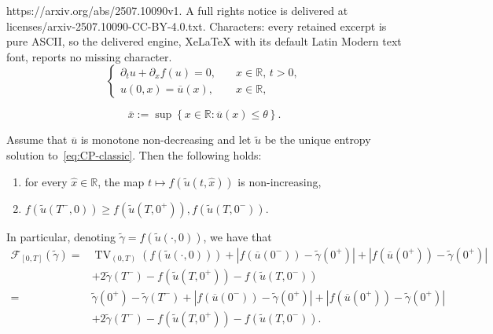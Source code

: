 \documentclass[10pt,a4paper]{amsart}
\newcommand{\R}{\mathbb{R}} \newcommand{\N}{\mathbb{N}}
\newcommand{\pt}{\partial_t}
\newcommand{\px}{\partial_x }
\DeclareMathOperator{\tv}{TV}
\begin{document}
https://arxiv.org/abs/2507.10090v1. A full rights notice is delivered at licenses/arxiv-2507.10090-CC-BY-4.0.txt. Characters: every retained excerpt is pure ASCII, so the delivered engine, XeLaTeX with its default Latin Modern text font, reports no missing character.
\begin{equation}
  \label{eq:CP-classic}
\begin{cases} \pt u + \px f(u) = 0, \quad & x \in \R, \, t > 0,\\ 
    u(0,x)= \overline u(x), & x \in \R,\end{cases}
\end{equation}

\begin{equation}\label{xbar} \bar x:= \sup\left\{x \in \R: \overline u(x) \le \theta\right\}.\end{equation}

\begin{lemma}\label{lemmafdecrescente}
  Assume that $\overline u $ is monotone non-decreasing and let  $\widetilde u$ be the unique entropy solution 
  to~\eqref{eq:CP-classic}.
  Then the following holds:
\begin{enumerate} \item for every $\hat x \in \R$, the map $t \mapsto f(\widetilde{u}(t, \hat{x}))$ is
  non-increasing,
  \item $f(\widetilde{u}(T^-, 0))\geq f(\widetilde{u}(T, 0^+)), f(\widetilde{u}(T, 0^-))$.\end{enumerate}

In particular, denoting $\widetilde \gamma=f(\widetilde u(\cdot,0))$, we have that 
\begin{align*} \mathcal F_{[0, T]}(\widetilde\gamma)
     = &
      \tv_{(0, T)}(f(\widetilde u(\cdot, 0)))
    +
    |f(\overline u(0^-))- \widetilde\gamma(0^+)| + 
    |f(\overline u(0^+))- \widetilde \gamma(0^+)| \\
    &+ 2\widetilde\gamma(T^-)-f(\widetilde{u}(T, 0^+))-f(\widetilde{u}(T, 0^-))
\\ = &  \widetilde \gamma(0^+)- \widetilde \gamma(T^-) +
    |f(\overline u(0^-))- \widetilde\gamma(0^+)| + 
    |f(\overline u(0^+))- \widetilde \gamma(0^+)| \\
    &+ 2\widetilde\gamma(T^-)-f(\widetilde{u}(T, 0^+))-f(\widetilde{u}(T, 0^-)).\end{align*}  
\end{lemma}
\end{document}
